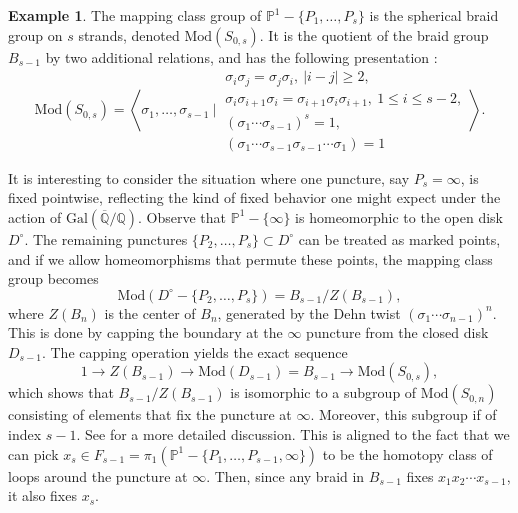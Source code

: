 \documentclass[10pt]{amsart}
\theoremstyle{definition}
\newtheorem{example}[theorem]{Example}
\newcommand{\Q}{\mathbb{Q}}
\newcommand{\Gal}{{ \mathrm{Gal}}}
\begin{document}
\begin{example} \label{rem:sphere}
The mapping class group of $\mathbb{P}^1-\{P_1,\ldots,P_s\}$ is the spherical braid group on $s$ strands, denoted $\mathrm{Mod}(S_{0,s})$. It is the quotient of the braid group $B_{s-1}$ by two additional relations, and has the following presentation \cite[P. 123]{FarbMagalit}:
\begin{equation}
\label{eq:sphMod}
  \mathrm{Mod}(S_{0,s})=
\left\langle \sigma_1,\ldots,\sigma_{s-1} \ \Big| \ 
\begin{array}{l} 
\sigma_i \sigma_j = \sigma_j \sigma_i, \ |i-j|\geq 2,  
\\
\sigma_i \sigma_{i+1} \sigma_i = \sigma_{i+1} \sigma_i \sigma_{i+1}, \ 1\leq i \leq s-2, 
\\
(\sigma_1 \cdots \sigma_{s-1})^s=1,
\\  (\sigma_1 \cdots \sigma_{s-1} \sigma_{s-1}\cdots \sigma_1)=1
\end{array}
\right \rangle.
\end{equation}

It is interesting to consider the situation where one puncture, say $P_s = \infty$, is fixed pointwise, reflecting the kind of fixed behavior one might expect under the action of $\Gal(\overline{\Q}/\Q)$.
Observe that $\mathbb{P}^1-\{\infty\}$ is homeomorphic to the open disk $D^\circ$.
The remaining punctures $\{P_2,\ldots,P_s\} \subset D^\circ $ can be treated as marked points, and if we allow homeomorphisms that permute these points, the mapping class group becomes 
$$\mathrm{Mod}(D^\circ - \{P_2,\ldots,P_s\}) = B_{s-1}/Z(B_{s-1}),$$ 
where $Z(B_n)$ is the center of $B_n$, generated by the Dehn twist $(\sigma_1 \cdots \sigma_{n-1})^n$. This is done by capping the boundary at the $\infty$ puncture from the closed disk $D_{s-1}$. The capping operation yields the exact sequence 
\[
  1\rightarrow Z(B_{s-1}) \rightarrow \mathrm{Mod}(D_{s-1})=B_{s-1} \rightarrow \mathrm{Mod}(S_{0,s}),
\] 
which shows that $B_{s-1}/Z(B_{s-1})$ is isomorphic to a subgroup of $\mathrm{Mod}(S_{0,n})$ consisting of elements that fix the puncture at $\infty$. Moreover, this subgroup if of index $s-1$. 
See \cite[P. 248]{FarbMagalit} for a more detailed discussion. 
This is aligned to the fact that we can pick $x_s \in F_{s-1} = \pi_1(\mathbb{P}^1-\{P_1,\ldots,P_{s-1},\infty\})$ to be the homotopy class of loops around the puncture at $\infty$. Then, since any braid in $B_{s-1}$ fixes $x_1x_2\cdots x_{s-1}$, it also fixes $x_s$.
\end{example}
\end{document}
